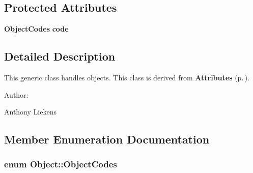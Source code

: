 \subsection*{Protected Attributes}
\begin{CompactItemize}
\item 
{\bf Object\-Codes} {\bf code}
\end{CompactItemize}


\subsection{Detailed Description}
This generic class handles objects. This class is derived from {\bf Attributes} {\rm (p.\,\pageref{classAttributes})}. \begin{Desc}
\item[Author: ]\par
Anthony Liekens \end{Desc}




\subsection{Member Enumeration Documentation}
\subsubsection{\setlength{\rightskip}{0pt plus 5cm}enum Object::Object\-Codes}\label{classObject_s7}


